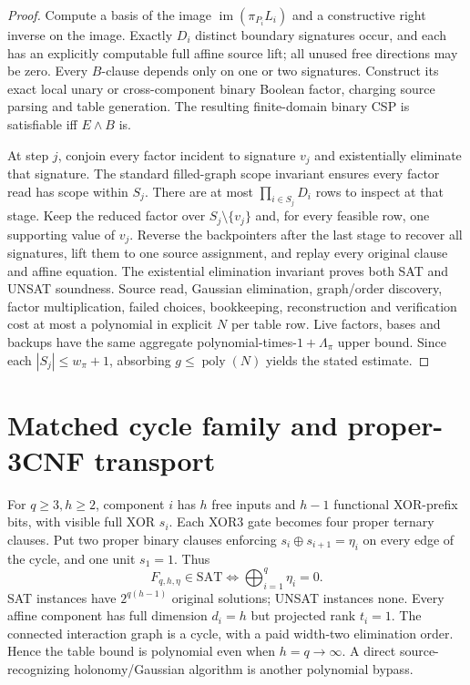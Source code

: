 \documentclass[11pt]{article}
\begin{document}
\begin{proof}
Compute a basis of the image $\operatorname{im}(\pi_{P_i}L_i)$ and a constructive right inverse on the image. Exactly $D_i$ distinct boundary signatures occur, and each has an explicitly computable full affine source lift; all unused free directions may be zero. Every $B$-clause depends only on one or two signatures. Construct its exact local unary or cross-component binary Boolean factor, charging source parsing and table generation. The resulting finite-domain binary CSP is satisfiable iff $E\land B$ is.

At step $j$, conjoin every factor incident to signature $v_j$ and existentially eliminate that signature. The standard filled-graph scope invariant ensures every factor read has scope within $S_j$. There are at most $\prod_{i\in S_j}D_i$ rows to inspect at that stage. Keep the reduced factor over $S_j\setminus\{v_j\}$ and, for every feasible row, one supporting value of $v_j$. Reverse the backpointers after the last stage to recover all signatures, lift them to one source assignment, and replay every original clause and affine equation. The existential elimination invariant proves both SAT and UNSAT soundness. Source read, Gaussian elimination, graph/order discovery, factor multiplication, failed choices, bookkeeping, reconstruction and verification cost at most a polynomial in explicit $N$ per table row. Live factors, bases and backups have the same aggregate polynomial-times-$1+\Lambda_\pi$ upper bound. Since each $|S_j|\le w_\pi+1$, absorbing $g\le\operatorname{poly}(N)$ yields the stated estimate.
\end{proof}

\section{Matched cycle family and proper-3CNF transport}
For $q\ge3,h\ge2$, component $i$ has $h$ free inputs and $h-1$ functional XOR-prefix bits, with visible full XOR $s_i$. Each XOR3 gate becomes four proper ternary clauses. Put two proper binary clauses enforcing $s_i\oplus s_{i+1}=\eta_i$ on every edge of the cycle, and one unit $s_1=1$. Thus
\[
F_{q,h,\eta}\in\mathrm{SAT}\iff\bigoplus_{i=1}^q\eta_i=0.
\]
SAT instances have $2^{q(h-1)}$ original solutions; UNSAT instances none. Every affine component has full dimension $d_i=h$ but projected rank $t_i=1$. The connected interaction graph is a cycle, with a paid width-two elimination order. Hence the table bound is polynomial even when $h=q\to\infty$. A direct source-recognizing holonomy/Gaussian algorithm is another polynomial bypass.
\end{document}
